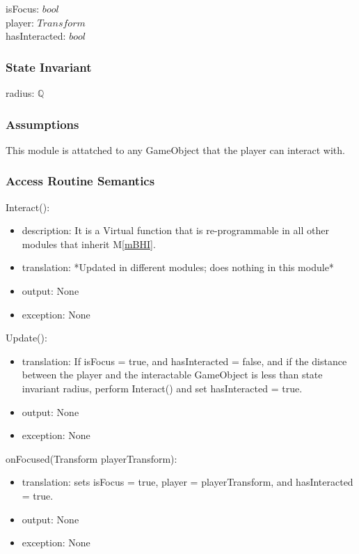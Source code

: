 \documentclass[12pt]{article}
\newcommand{\mref}[1]{M\ref{#1}}
\begin{document}
isFocus: $bool$\\
player: $Transform$\\
hasInteracted: $bool$

\subsubsection* {State Invariant}

radius: $\mathbb{Q}$\\

\subsubsection* {Assumptions}

This module is attatched to any GameObject that the player can interact with. 

\subsubsection* {Access Routine Semantics}

\noindent Interact():
\begin{itemize}
\item description: It is a Virtual function that is re-programmable in all other modules that inherit \mref{mBHI}.
\item translation: *Updated in different modules; does nothing in this module*
\item output: None
\item exception: None
\end{itemize}

\noindent Update():
\begin{itemize}
\item translation: If isFocus = true, and hasInteracted = false, and if the distance between the player and the interactable GameObject is less than state invariant radius, perform Interact() and set hasInteracted = true.
\item output: None
\item exception: None
\end{itemize}

\noindent onFocused(Transform playerTransform):
\begin{itemize}
\item translation: sets isFocus = true, player = playerTransform, and hasInteracted = true.
\item output: None
\item exception: None
\end{itemize}
\end{document}
